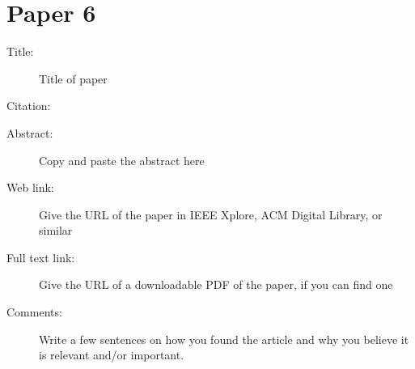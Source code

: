 \documentclass{scrartcl}
\begin{document}
\section*{Paper 6}
\begin{description}
\item[Title:] Title of paper
\item[Citation:] \cite{bibtex_key}
\item[Abstract:] Copy and paste the abstract here
\item[Web link:] Give the URL of the paper in IEEE Xplore, ACM Digital Library, or similar
\item[Full text link:] Give the URL of a downloadable PDF of the paper, if you can find one
\item[Comments:] Write a few sentences on how you found the article and why you believe it is relevant and/or important.
\end{description}



\end{document}
